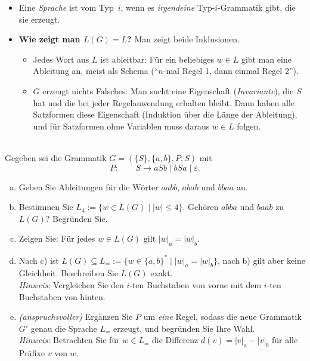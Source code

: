\begin{notes}
\begin{itemize}
  \item Eine \emph{Sprache} ist vom Typ~$i$, wenn es \emph{irgendeine} Typ-$i$-Grammatik gibt, die sie erzeugt.
  \item \textbf{Wie zeigt man $L(G)=L$?} Man zeigt beide Inklusionen.
  \begin{itemize}
    \item[$\supseteq$] Jedes Wort aus $L$ ist ableitbar: Für ein beliebiges $w\in L$ gibt man eine Ableitung an, meist als Schema (\enquote{$n$-mal Regel 1, dann einmal Regel 2}).
    \item[$\subseteq$] $G$ erzeugt nichts Falsches: Man sucht eine Eigenschaft (\emph{Invariante}), die $S$ hat und die bei jeder Regelanwendung erhalten bleibt. Dann haben alle Satzformen diese Eigenschaft (Induktion über die Länge der Ableitung), und für Satzformen ohne Variablen muss daraus $w\in L$ folgen.
  \end{itemize}
\end{itemize}
\end{notes}

\\
Gegeben sei die Grammatik $G=(\{S\},\{a,b\},P,S)$ mit
\[P:\qquad S\to aSb\mid bSa\mid\varepsilon.\]
\begin{enumerate}[a)]
  \item Geben Sie Ableitungen für die Wörter $aabb$, $abab$ und $bbaa$ an.
  \item Bestimmen Sie $L_4:=\{w\in L(G)\mid |w|\leq 4\}$. Gehören $abba$ und $baab$ zu $L(G)$? Begründen Sie.
  \item Zeigen Sie: Für jedes $w\in L(G)$ gilt $|w|_a=|w|_b$.
  \item Nach c) ist $L(G)\subseteq L_{=}:=\{w\in\{a,b\}^*\mid |w|_a=|w|_b\}$, nach b) gilt aber keine Gleichheit. Beschreiben Sie $L(G)$ exakt.\\
  \emph{Hinweis:} Vergleichen Sie den $i$-ten Buchstaben von vorne mit dem $i$-ten Buchstaben von hinten.
  \item \textit{(anspruchsvoller)} Ergänzen Sie $P$ um \emph{eine} Regel, sodass die neue Grammatik $G'$ genau die Sprache $L_{=}$ erzeugt, und begründen Sie Ihre Wahl.\\
  \emph{Hinweis:} Betrachten Sie für $w\in L_{=}$ die Differenz $d(v)=|v|_a-|v|_b$ für alle Präfixe $v$ von $w$.
\end{enumerate}

